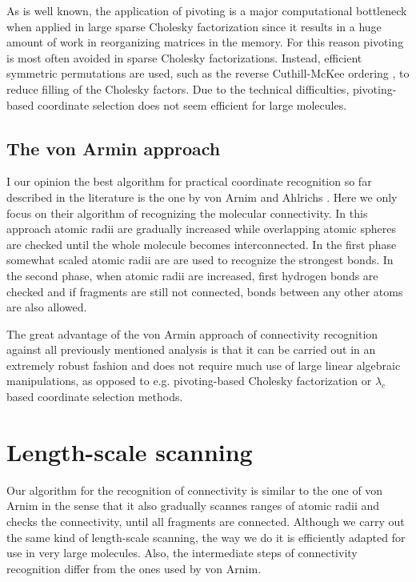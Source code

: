 \documentclass[prl,aps,preprint,superbib,12pt]{revtex4}
\begin{document}
As is well known, the application of pivoting
is a major computational bottleneck when applied in large sparse 
Cholesky factorization \cite{AGeorge81} 
since it results in a huge amount of work
in reorganizing matrices in the memory. For this reason pivoting is 
most often avoided in sparse Cholesky factorizations. Instead,
efficient symmetric permutations are used, such as the
reverse Cuthill-McKee ordering \cite{AGeorge81}, to reduce filling
of the Cholesky factors. Due to the technical difficulties,
pivoting-based coordinate selection does not seem efficient for large 
molecules.

\subsection{The von Armin approach}
I our opinion the best algorithm for practical 
coordinate recognition so far described
in the literature is the one by von Arnim and Ahlrichs 
\cite{MvonArnim99}. Here we only focus on their algorithm of 
recognizing the molecular connectivity. In this approach
atomic radii are gradually increased while overlapping atomic 
spheres are checked until the whole molecule becomes interconnected.   
In the first phase somewhat scaled atomic radii are are used
to recognize the strongest bonds. In the second phase, when 
atomic radii are increased, first hydrogen bonds are checked and 
if fragments are still not connected, bonds between any other atoms
are also allowed. 

The great advantage of the von Armin approach of
connectivity recognition against all previously
mentioned analysis is that it can be carried out in an extremely robust
fashion and does not require much use of large linear algebraic
manipulations, as opposed to e.g. pivoting-based Cholesky 
factorization or $\lambda_{c}$ based coordinate selection methods.

\section{Length-scale scanning}
Our algorithm for the recognition of connectivity is similar
to the one of von Arnim in the sense that it also gradually scannes 
ranges of atomic radii and checks the connectivity, until all fragments
are connected. Although we carry out the same kind of length-scale
scanning, the way we do it is efficiently adapted for use in very large
molecules. Also, the intermediate steps of connectivity recognition
differ from the ones used by von Arnim.  
\end{document}
